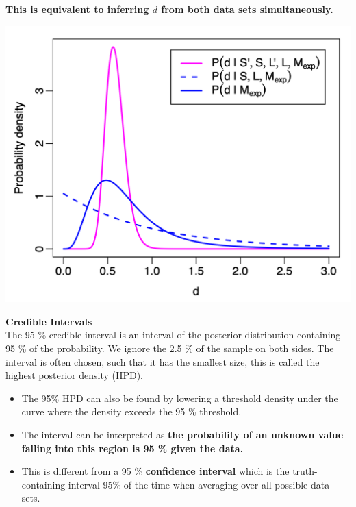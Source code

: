 \documentclass{article}
\begin{document}
\begin{multicols*}{3}
\textbf{This is equivalent to inferring $d$ from both data sets simultaneously.}

\begin{center}
    \includegraphics[width=1\linewidth, angle=0.0]{bayesprior.png}
\end{center}

\begin{mdframed}[backgroundcolor=astral] 
    \textbf{Credible Intervals}\\
    The 95 \% credible interval is an interval of the posterior distribution containing 95 \% of the probability. We ignore the 2.5 \% of the sample on both sides. The interval is often chosen, such that it has the smallest size, this is called the highest posterior density (HPD).
    
    \begin{itemize}
        \item The 95\% HPD can also be found by lowering a threshold density under the curve where the density exceeds the 95 \% threshold. 
        \item The interval can be interpreted as \textbf{the probability of an unknown value falling into this region is 95 \% given the data.}
        \item This is different from a 95 \% \textbf{confidence interval} which is the truth-containing interval 95\% of the time when averaging over all possible data sets.  
    \end{itemize}
\end{mdframed}


\end{multicols*}
\end{document}
